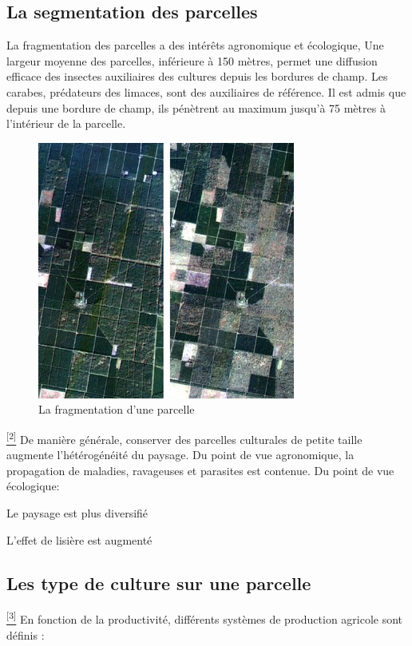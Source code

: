 \documentclass[12pt, openany]{report}
\begin{document}
\subsection{La segmentation des parcelles}

La fragmentation des parcelles a des intérêts agronomique et écologique, Une largeur moyenne des parcelles, inférieure à 150 mètres, permet une diffusion efficace des insectes auxiliaires des cultures depuis les bordures de champ.
Les carabes, prédateurs des limaces, sont des auxiliaires de référence. Il est admis que depuis une bordure de champ, ils pénètrent au maximum jusqu’à 75 mètres à l’intérieur de la parcelle.

\begin{figure}[hp]
\centering
\includegraphics[scale=1]{seg.jpg}
\caption{La fragmentation d'une parcelle}
\end{figure}


\hyperref[sec:refs]{\textsuperscript{[2]}} De manière générale, conserver des parcelles culturales de petite taille augmente l'hétérogénéité du paysage.
Du point de vue agronomique, la propagation de maladies, ravageuses et parasites est contenue.
Du point de vue écologique:
\begin{mylist}
\item Le paysage est plus diversifié
\item L’effet de lisière est augmenté 
\end{mylist}

\subsection{Les type de culture sur une parcelle}
\hyperref[sec:refs]{\textsuperscript{[3]}} En fonction de la productivité, différents systèmes de production agricole sont définis :
\end{document}
